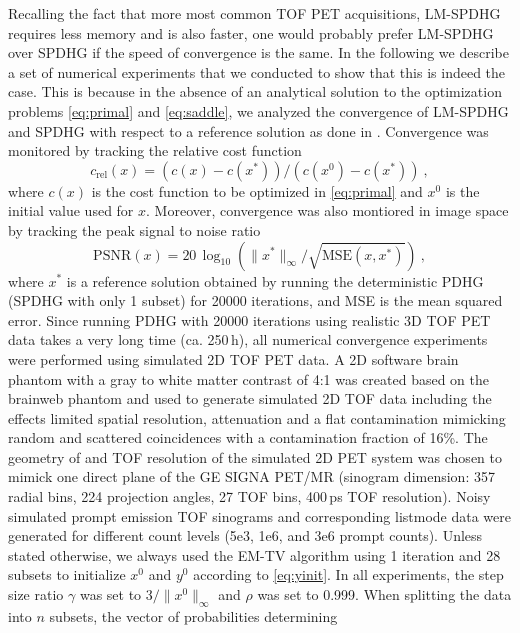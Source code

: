 Recalling the fact that more most common TOF PET acquisitions, LM-SPDHG requires less memory and 
is also faster, one would probably prefer LM-SPDHG over SPDHG if the speed of convergence is the same.
In the following we describe a set of numerical experiments that we conducted to show that this
is indeed the case.
This is because in the absence of an analytical solution to the optimization problems \eqref{eq:primal}
and \eqref{eq:saddle}, we analyzed the convergence of LM-SPDHG and SPDHG with respect to a 
reference solution as done in \cite{Ehrhardt2019}.
Convergence was monitored by tracking the relative cost function
\begin{equation}
c_\text{rel}(x) = (c(x) - c(x^*)) / (c(x^0) - c(x^*)) \ ,
\end{equation}
where $c(x)$ is the cost function to be optimized in \eqref{eq:primal} and $x^0$ is the initial value
used for $x$.
Moreover, convergence was also montiored in image space by tracking the peak signal to noise ratio
\begin{equation}
\text{PSNR}(x) = 20\,\log_{10} \left( \|x^*\|_\infty/\sqrt{\text{MSE}(x,x^*)} \right) \ ,
\end{equation}
where $x^*$ is a reference solution obtained by running the deterministic PDHG (SPDHG with only 1 subset)
for 20000 iterations, and MSE is the mean squared error.
Since running PDHG with 20000 iterations using realistic 3D TOF PET data takes a very long 
time (ca. 250\,h), all numerical convergence experiments were performed using simulated 2D TOF PET data.
A 2D software brain phantom with a gray to white matter contrast of 4:1 was created
based on the brainweb phantom \cite{Collins1998} and used to generate simulated 2D TOF data 
including the effects limited spatial resolution, attenuation and a flat contamination mimicking 
random and scattered coincidences with a contamination fraction of 16\%.
The geometry of and TOF resolution of the simulated 2D PET system was chosen to 
mimick one direct plane of the GE SIGNA PET/MR 
(sinogram dimension: 357 radial bins, 224 projection angles, 27 TOF bins, 400\,ps TOF resolution).
Noisy simulated prompt emission TOF sinograms and corresponding listmode data were generated
for different count levels (5e3, 1e6, and 3e6 prompt counts).
Unless stated otherwise, we always used the EM-TV algorithm using 1 iteration and 28 subsets
to initialize $x^0$ and $y^0$ according to \eqref{eq:yinit}.
In all experiments, the step size ratio $\gamma$ was set to $3 / \|x^0\|_\infty$ and $\rho$ was
set to 0.999.
When splitting the data into $n$ subsets, the vector of probabilities determining 
